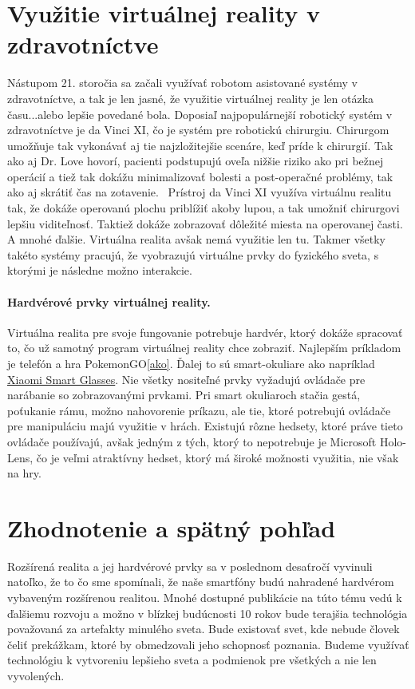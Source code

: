 \documentclass[10pt,twoside,a4paper]{article}
\begin{document}
\section{Využitie virtuálnej reality v zdravotníctve} \label{zdravotnictvo}
Nástupom 21. storočia sa začali využívať robotom asistované systémy v zdravotníctve, a tak je len jasné, že využitie virtuálnej reality je len otázka času...alebo lepšie povedané bola. Doposiaľ najpopulárnejší robotický systém v zdravotníctve je da Vinci XI, čo je systém pre robotickú chirurgiu. Chirurgom umožňuje tak vykonávať aj tie najzložitejšie scenáre, keď príde k chirurgií. Tak ako aj Dr. Love hovorí, pacienti podstupujú oveľa nižšie riziko ako pri bežnej operácií a tiež tak dokážu minimalizovať bolesti a post-operačné problémy, tak ako aj skrátiť čas na zotavenie.~\cite{XiRobots}
Prístroj da Vinci XI využíva virtuálnu realitu tak, že dokáže operovanú plochu priblížiť akoby lupou, a tak umožniť chirurgovi lepšiu viditeľnosť. Taktiež dokáže zobrazovať dôležité miesta na operovanej časti. A mnohé ďalšie. Virtuálna realita avšak nemá využitie len tu. Takmer všetky takéto systémy pracujú, že vyobrazujú virtuálne prvky do fyzického sveta, s ktorými je následne možno interakcie. 

\paragraph{Hardvérové prvky virtuálnej reality.}
Virtuálna realita pre svoje fungovanie potrebuje hardvér, ktorý dokáže spracovať to, čo už samotný program virtuálnej reality chce zobraziť. Najlepším príkladom je telefón a hra PokemonGO\ref{ako}. Ďalej to sú smart-okuliare ako napríklad \href{https://www.mi.com/global/discover/search?key=SMART%20GLASSES}{Xiaomi Smart Glasses}. Nie všetky nositeľné prvky vyžadujú ovládače pre narábanie so zobrazovanými prvkami. Pri smart okuliaroch stačia gestá, poťukanie rámu, možno nahovorenie príkazu, ale tie, ktoré potrebujú ovládače pre manipuláciu majú využitie v hrách. Existujú rôzne hedsety, ktoré práve tieto ovládače používajú, avšak jedným z tých, ktorý to nepotrebuje je Microsoft Holo-Lens, čo je veľmi atraktívny hedset, ktorý má široké možnosti využitia, nie však na hry.

\section{Zhodnotenie a spätný pohľad} \label{konec}
Rozšírená realita a jej hardvérové prvky sa v poslednom desaťročí vyvinuli natoľko, že to čo sme spomínali, že naše smartfóny budú nahradené hardvérom vybaveným rozšírenou realitou. Mnohé dostupné publikácie na túto tému vedú k ďalšiemu rozvoju a možno v blízkej budúcnosti 10 rokov bude terajšia technológia považovaná za artefakty minulého sveta. Bude existovať svet, kde nebude človek čeliť prekážkam, ktoré by obmedzovali jeho schopnosť poznania. Budeme využívať technológiu k vytvoreniu lepšieho sveta a podmienok pre všetkých a nie len vyvolených.
\end{document}
